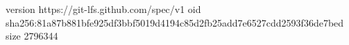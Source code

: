 version https://git-lfs.github.com/spec/v1
oid sha256:81a87b881bfe925df3bbf5019d4194c85d2fb25add7e6527cdd2593f36de7bed
size 2796344
